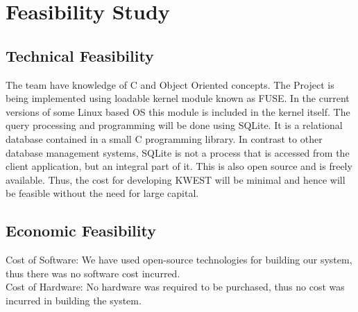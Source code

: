 \section{Feasibility Study}
\subsection{Technical Feasibility}
The team have knowledge of C and Object Oriented concepts. The Project is being implemented using loadable kernel module known as FUSE. In the current versions of some Linux based OS this module is included in the kernel itself.
The query processing and programming will be done using SQLite. It is a relational database contained in a small C programming library. In contrast to other database management systems, SQLite is not a process that is accessed from the client application, but an integral part of it. This is also open source and is freely available.
Thus, the cost for developing KWEST will be minimal and hence will be feasible without the need for large capital.

\subsection{Economic Feasibility}
Cost of Software: We have used open-source technologies for building our system, thus there was no software cost incurred.\\
Cost of Hardware: No hardware was required to be purchased, thus no cost was incurred in building the system.
